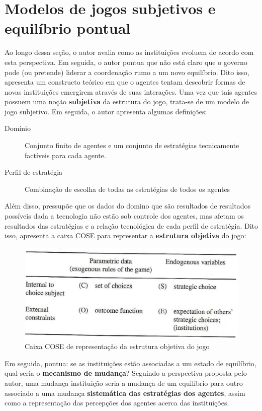\documentclass[9pt,twocolumn,twoside,lineno]{style}
\begin{document}
\section{Modelos de jogos subjetivos e equilíbrio pontual}

Ao longo dessa seção, o autor avalia como as instituições evoluem de acordo com esta perspectiva. Em seguida, o autor pontua que não está claro que o governo pode (ou pretende) liderar a coordenação rumo a um novo equilíbrio. Dito isso, apresenta um constructo teórico em que o agentes tentam descobrir formas de novas instituições emergirem através de suas interações. Uma vez que tais agentes possuem uma noção \textbf{subjetiva} da estrutura do jogo, trata-se de um modelo de jogo subjetivo. Em seguida, o autor apresenta algumas definições:

\begin{description}
	\item[Domínio] Conjunto finito de agentes e um conjunto de estratégias tecnicamente factíveis para cada agente.
	\item[Perfil de estratégia] Combinação de escolha de todas as estratégias de todos os agentes
\end{description}
Além disso, pressupõe que os dados do domino que são resultados de resultados possíveis dada a tecnologia não estão sob controle dos agentes, mas afetam os resultados das estratégias e a relação tecnológica de cada perfil de estratégia. Dito isso, apresenta a caixa COSE para representar a \textbf{estrutura objetiva} do jogo:

\begin{figure}[H]
	\centering
	\caption[Caixa COSE]{Caixa COSE de representação da estrutura objetiva do jogo}
	\label{fig:screenshot001}
	\includegraphics[width=\linewidth]{screenshot001}
\end{figure}


Em seguida, pontua: se as instituições estão associadas a um estado de equilíbrio, qual seria o \textbf{mecanismo de mudança}? Seguindo a perspectiva proposta pelo autor, uma mudança instituição seria a mudança de um equilíbrio para outro associado a uma mudança \textbf{sistemática das estratégias dos agentes}, assim como a representação das percepções dos agentes acerca das instituições.
\end{document}
